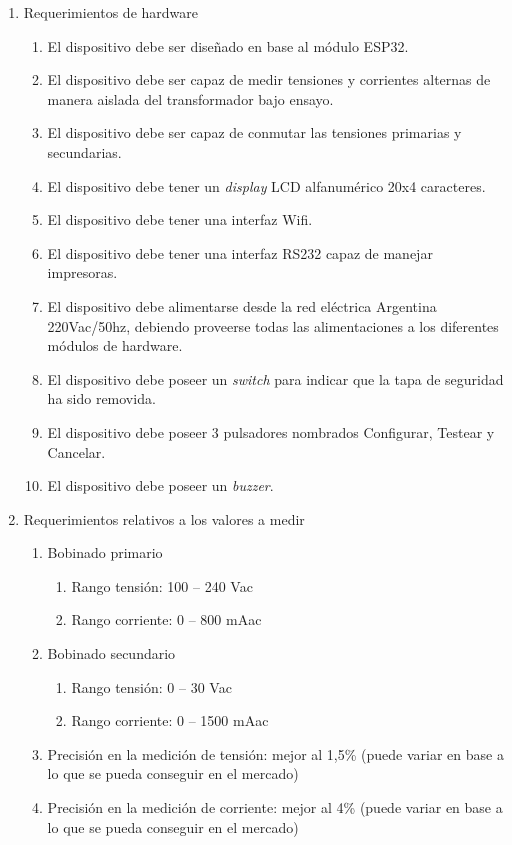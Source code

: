 \documentclass[11pt]{charter}
\begin{document}
\begin{enumerate}
\item Requerimientos de hardware
	\begin{enumerate}
	\item El dispositivo debe ser diseñado en base al módulo ESP32.
	\item El dispositivo debe ser capaz de medir tensiones y corrientes alternas de manera aislada del transformador bajo ensayo.
	\item El dispositivo debe ser capaz de conmutar las tensiones primarias y secundarias.
	\item El dispositivo debe tener un \textit{display} LCD alfanumérico 20x4 caracteres.
	\item El dispositivo debe tener una interfaz Wifi.
	\item El dispositivo debe tener una interfaz RS232 capaz de manejar impresoras.
	\item El dispositivo debe alimentarse desde la red eléctrica Argentina 220Vac/50hz, debiendo proveerse todas las alimentaciones a los diferentes módulos de hardware.
	\item El dispositivo debe poseer un \textit{switch} para indicar que la tapa de seguridad ha sido removida.
	\item El dispositivo debe poseer 3 pulsadores nombrados Configurar, Testear y Cancelar.
	\item El dispositivo debe poseer un \textit{buzzer}.
	\end{enumerate}
\item Requerimientos relativos a los valores a medir
	\begin{enumerate}
	\item Bobinado primario
		\begin{enumerate}
		\item Rango tensión: 100 – 240 Vac
		\item Rango corriente: 0 – 800 mAac
		\end{enumerate}
	\item Bobinado secundario
		\begin{enumerate}
		\item Rango tensión: 0 – 30 Vac
		\item Rango corriente: 0 – 1500 mAac
		\end{enumerate}
	\item Precisión en la medición de tensión: mejor al 1,5\% (puede variar en base a lo que se pueda conseguir en el mercado)
	\item Precisión en la medición de corriente: mejor al 4\% (puede variar en base a lo que se pueda conseguir en el mercado)

\end{enumerate}
\end{enumerate}
\end{document}
